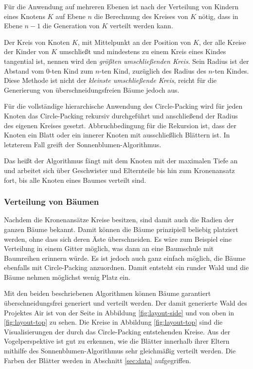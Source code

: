 Für die Anwendung auf mehreren Ebenen ist nach der Verteilung von Kindern eines Knotens $K$ auf Ebene $n$ die Berechnung des Kreises von $K$ nötig, dass in Ebene $n - 1$ die Generation von $K$ verteilt werden kann.

Der Kreis von Knoten $K$, mit Mittelpunkt an der Position von $K$, der alle Kreise der Kinder von $K$ umschließt und mindestens zu einem Kreis eines Kindes tangential ist, nennen wird den \textit{größten umschließenden Kreis}. Sein Radius ist der Abstand vom $0$-ten Kind zum $n$-ten Kind, zuzüglich des Radius des $n$-ten Kindes. Diese Methode ist nicht der \textit{kleinste umschließende Kreis}, reicht für die Generierung von überschneidungsfreien Bäume jedoch aus.

Für die vollständige hierarchische Anwendung des Circle-Packing wird für jeden Knoten das Circle-Packing rekursiv durchgeführt und anschließend der Radius des eigenen Kreises gesetzt. Abbruchbedingung für die Rekursion ist, dass der Knoten ein Blatt oder ein innerer Knoten mit ausschließlich Blättern ist. In letzterem Fall greift der Sonnenblumen-Algorithmus.

Das heißt der Algorithmus fängt mit dem Knoten mit der maximalen Tiefe an und arbeitet sich über Geschwister und Elternteile bis hin zum Kronenansatz fort, bis alle Knoten eines Baumes verteilt sind.

\subsubsection*{Verteilung von Bäumen}


Nachdem die Kronenansätze Kreise besitzen, sind damit auch die Radien der ganzen Bäume bekannt. Damit können die Bäume prinzipiell beliebig platziert werden, ohne dass sich deren Äste überschneiden. Es wäre zum Beispiel eine Verteilung in einem Gitter möglich, was dann an eine Baumschule mit Baumreihen erinnern würde. Es ist jedoch auch ganz einfach möglich, die Bäume ebenfalls mit Circle-Packing anzuordnen. Damit entsteht ein runder Wald und die Bäume nehmen möglichst wenig Platz ein.

Mit den beiden beschriebenen Algorithmen können Bäume garantiert überschneidungsfrei generiert und verteilt werden. Der damit generierte Wald des Projektes Air ist von der Seite in Abbildung \ref{fig:layout-side} und von oben in \ref{fig:layout-top} zu sehen. Die Kreise in Abbildung \ref{fig:layout-top} sind die Visualisierungen der durch das Circle-Packing entstehenden Kreise. Aus der Vogelperspektive ist gut zu erkennen, wie die Blätter innerhalb ihrer Eltern mithilfe des Sonnenblumen-Algorithmus sehr gleichmäßig verteilt werden. Die Farben der Blätter werden in Abschnitt \ref{sec:data} aufgegriffen.

